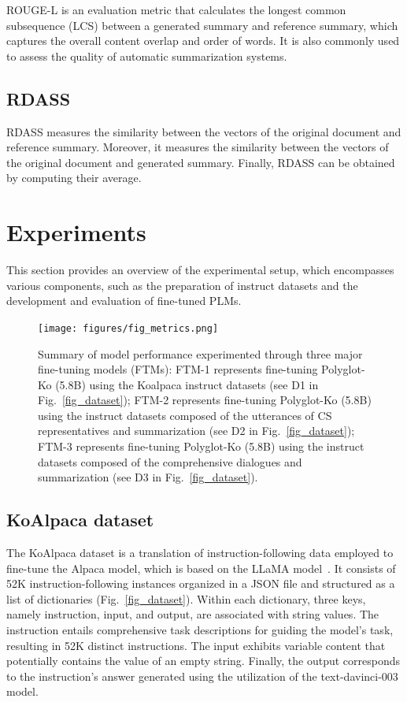 \documentclass[sigconf]{acmart}
\begin{document}
ROUGE-L is an evaluation metric that calculates the longest common subsequence (LCS) between a generated summary and reference summary, which captures the overall content overlap and order of words. It is also commonly used to assess the quality of automatic summarization systems.

\subsection{RDASS} RDASS measures the similarity between the vectors of the original document and reference summary. Moreover, it measures the similarity between the vectors of the original document and generated summary. Finally, RDASS can be obtained by computing their average.



\section{Experiments}\label{experiments}
This section provides an overview of the experimental setup, which encompasses various components, such as the preparation of instruct datasets and the development and evaluation of fine-tuned PLMs.




\begin{figure}[t!]
  \centering
  \texttt{[image: figures/fig\_metrics.png]}
  \caption{Summary of model performance experimented through three major fine-tuning models (FTMs): FTM-1 represents fine-tuning Polyglot-Ko (5.8B) using the Koalpaca instruct datasets (see D1 in Fig.~\ref{fig_dataset}); FTM-2 represents fine-tuning Polyglot-Ko (5.8B) using the instruct datasets composed of the utterances of CS representatives and summarization (see D2 in Fig.~\ref{fig_dataset}); FTM-3 represents fine-tuning Polyglot-Ko (5.8B) using the instruct datasets composed of the comprehensive dialogues and summarization (see D3 in Fig.~\ref{fig_dataset}). 
  }
\label{fig_metrics}
\end{figure}


\subsection{KoAlpaca dataset}
The KoAlpaca dataset is a translation of instruction-following data employed to fine-tune the Alpaca model, which is based on the LLaMA model~\cite{alpaca}. It consists of 52K instruction-following instances organized in a JSON file and structured as a list of dictionaries (Fig.~\ref{fig_dataset}). Within each dictionary, three keys, namely instruction,  input, and  output, are associated with string values. The instruction entails comprehensive task descriptions for guiding the model's task, resulting in 52K distinct instructions. The input exhibits variable content that potentially contains the value of an empty string. Finally, the output corresponds to the instruction's answer generated using the utilization of the text-davinci-003 model.
\end{document}

